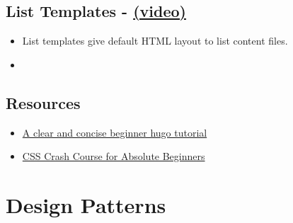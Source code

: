 \subsection{List Templates - \href{https://youtu.be/8b2YTSMdMps}{(video)}}
\begin{itemize}
	\item
	List templates give default HTML layout to list content files.
	\item

\end{itemize}

\subsection*{Resources}
\begin{itemize}
	\item
	\href{https://www.linkedin.com/learning/learning-static-site-building-with-hugo-2/build-a-static-site-with-hugo?resume=false}{A clear and concise beginner hugo tutorial}
	\item
	\href{https://youtu.be/yfoY53QXEnI}{CSS Crash Course for Absolute Beginners}
\end{itemize}

\section{Design Patterns}



